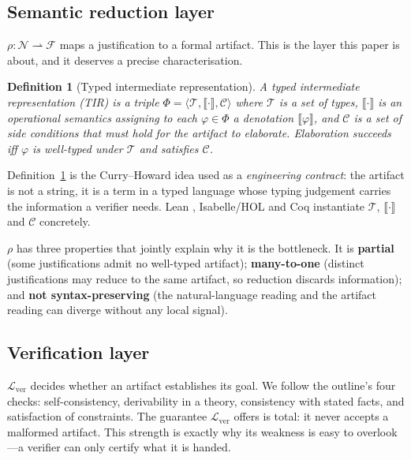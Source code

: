 \documentclass[11pt,a4paper]{article}
\theoremstyle{plain}
\newtheorem{definition}{Definition}
\theoremstyle{definition}
\newcommand{\LayerV}{\mathcal{L}_{\mathrm{ver}}}
\begin{document}
\subsection{Semantic reduction layer}

$\rho\colon\mathcal{N}\rightharpoonup\mathcal{F}$ maps a justification to a
formal artifact. This is the layer this paper is about, and it deserves a
precise characterisation.

\begin{definition}[Typed intermediate representation]
\label{def:tir}
A \emph{typed intermediate representation} (TIR) is a triple
$\Phi=\langle\mathcal{T},\llbracket\cdot\rrbracket,\mathcal{C}\rangle$
where $\mathcal{T}$ is a set of \emph{types}, $\llbracket\cdot\rrbracket$
is an \emph{operational semantics} assigning to each $\varphi\in\Phi$ a
denotation $\llbracket\varphi\rrbracket$, and $\mathcal{C}$ is a set of
\emph{side conditions} that must hold for the artifact to elaborate.
Elaboration succeeds iff $\varphi$ is well-typed under $\mathcal{T}$ and
satisfies $\mathcal{C}$.
\end{definition}

Definition~\ref{def:tir} is the Curry--Howard idea used as a
\emph{engineering contract}: the artifact is not a string, it is a
term in a typed language whose typing judgement carries the information a
verifier needs. Lean \citep{lean4tool}, Isabelle/HOL \citep{isabelle2002}
and Coq \citep{coqmanual} instantiate $\mathcal{T}$, $\llbracket\cdot\rrbracket$
and $\mathcal{C}$ concretely.

$\rho$ has three properties that jointly explain why it is the bottleneck.
It is \textbf{partial} (some justifications admit no well-typed artifact);
\textbf{many-to-one} (distinct justifications may reduce to the same
artifact, so reduction discards information); and \textbf{not
syntax-preserving} (the natural-language reading and the artifact reading
can diverge without any local signal).

\subsection{Verification layer}

$\LayerV$ decides whether an artifact establishes its goal. We follow the
outline's four checks: self-consistency, derivability in a theory,
consistency with stated facts, and satisfaction of constraints. The
guarantee $\LayerV$ offers is total: it never accepts a malformed artifact.
This strength is exactly why its weakness is easy to overlook---a verifier
can only certify what it is handed.
\end{document}
